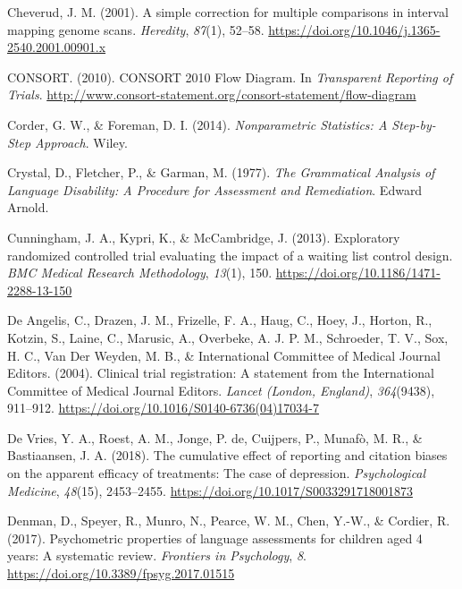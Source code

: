 \documentclass{krantz}
\newlength{\cslhangindent}
\newlength{\cslentryspacingunit} %
\newenvironment{CSLReferences}[2] %
{%
\setlength{\parindent}{0pt}
\ifodd #1
\let\oldpar\par
\def\par{\hangindent=\cslhangindent\oldpar}
\fi
\setlength{\parskip}{#2\cslentryspacingunit}
}%
{}
\begin{document}
\begin{CSLReferences}{1}{0}
\leavevmode{}%
Cheverud, J. M. (2001). A simple correction for multiple comparisons in interval mapping genome scans. \emph{Heredity}, \emph{87}(1), 52--58. \url{https://doi.org/10.1046/j.1365-2540.2001.00901.x}

\leavevmode{}%
CONSORT. (2010). {CONSORT} 2010 {Flow Diagram}. In \emph{Transparent Reporting of Trials}. \url{http://www.consort-statement.org/consort-statement/flow-diagram}

\leavevmode{}%
Corder, G. W., \& Foreman, D. I. (2014). \emph{Nonparametric {Statistics}: {A Step-by-Step Approach}}. {Wiley}.

\leavevmode{}%
Crystal, D., Fletcher, P., \& Garman, M. (1977). \emph{The {Grammatical Analysis} of {Language Disability}: {A Procedure} for {Assessment} and {Remediation}}. {Edward Arnold}.

\leavevmode{}%
Cunningham, J. A., Kypri, K., \& McCambridge, J. (2013). Exploratory randomized controlled trial evaluating the impact of a waiting list control design. \emph{BMC Medical Research Methodology}, \emph{13}(1), 150. \url{https://doi.org/10.1186/1471-2288-13-150}

\leavevmode{}%
De Angelis, C., Drazen, J. M., Frizelle, F. A., Haug, C., Hoey, J., Horton, R., Kotzin, S., Laine, C., Marusic, A., Overbeke, A. J. P. M., Schroeder, T. V., Sox, H. C., Van Der Weyden, M. B., \& International Committee of Medical Journal Editors. (2004). Clinical trial registration: A statement from the {International Committee} of {Medical Journal Editors}. \emph{Lancet (London, England)}, \emph{364}(9438), 911--912. \url{https://doi.org/10.1016/S0140-6736(04)17034-7}

\leavevmode{}%
De Vries, Y. A., Roest, A. M., Jonge, P. de, Cuijpers, P., Munafò, M. R., \& Bastiaansen, J. A. (2018). The cumulative effect of reporting and citation biases on the apparent efficacy of treatments: The case of depression. \emph{Psychological Medicine}, \emph{48}(15), 2453--2455. \url{https://doi.org/10.1017/S0033291718001873}

\leavevmode{}%
Denman, D., Speyer, R., Munro, N., Pearce, W. M., Chen, Y.-W., \& Cordier, R. (2017). Psychometric properties of language assessments for children aged 4 years: {A} systematic review. \emph{Frontiers in Psychology}, \emph{8}. \url{https://doi.org/10.3389/fpsyg.2017.01515}


\end{CSLReferences}
\end{document}
